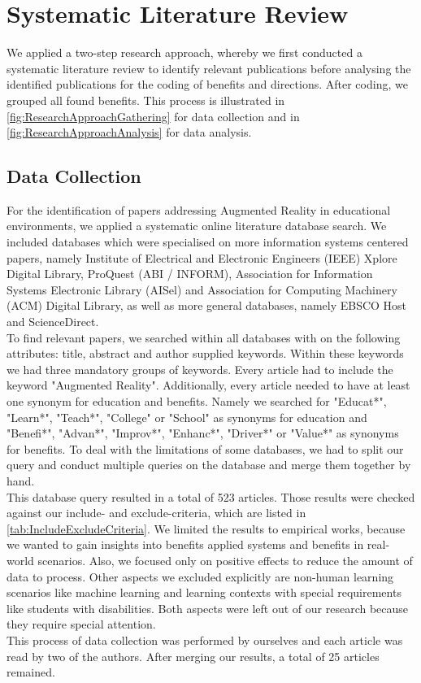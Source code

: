 \section{Systematic Literature Review}
We applied a two-step research approach, whereby we first conducted a systematic literature review to identify relevant publications before analysing the identified publications for the coding of benefits and directions. After coding, we grouped all found benefits. This process is illustrated in \ref{fig:ResearchApproachGathering} for data collection and in \ref{fig:ResearchApproachAnalysis} for data analysis.

\subsection{Data Collection}
For the identification of papers addressing Augmented Reality in educational environments, we applied a systematic online literature database search. We included databases which were specialised on more information systems centered papers, namely Institute of Electrical and Electronic Engineers (IEEE) Xplore Digital Library, ProQuest (ABI / INFORM), Association for Information Systems Electronic Library (AISel) and Association for Computing Machinery (ACM) Digital Library, as well as more general databases, namely EBSCO Host and ScienceDirect.\\
To find relevant papers, we searched within all databases with on the following attributes: title, abstract and author supplied keywords. Within these keywords we had three mandatory groups of keywords. Every article had to include the keyword "Augmented Reality". Additionally, every article needed to have at least one synonym for education and benefits. Namely we searched for "Educat*", "Learn*", "Teach*", "College" or "School" as synonyms for education and "Benefi*", "Advan*", "Improv*", "Enhanc*", "Driver*" or "Value*" as synonyms for benefits. To deal with the limitations of some databases, we had to split our query and conduct multiple queries on the database and merge them together by hand.\\
This database query resulted in a total of 523 articles. Those results were checked against our include- and exclude-criteria, which are listed in \ref{tab:IncludeExcludeCriteria}. We limited the results to empirical works, because we wanted to gain insights into benefits applied systems and benefits in real-world scenarios. Also, we focused only on positive effects to reduce the amount of data to process. Other aspects we excluded explicitly are non-human learning scenarios like machine learning and learning contexts with special requirements like students with disabilities. Both aspects were left out of our research because they require special attention. \\
This process of data collection was performed by ourselves and each article was read by two of the authors. After merging our results, a total of 25 articles remained.

